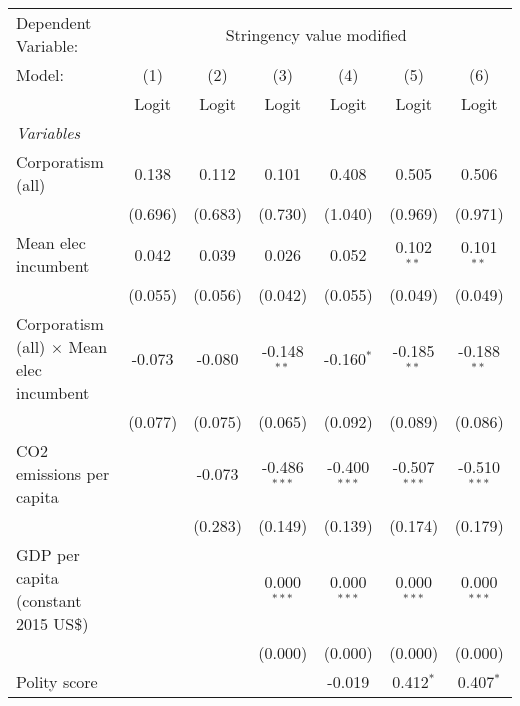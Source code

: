 
\begingroup
\centering
\begin{tabular}{lcccccc}
   \toprule
   Dependent Variable: & \multicolumn{6}{c}{Stringency value modified}\\
   Model:                                          & (1)     & (2)     & (3)            & (4)            & (5)            & (6)\\  
                                                   &  Logit  & Logit   & Logit          & Logit          & Logit          & Logit\\  
   \midrule
   \emph{Variables}\\
   Corporatism (all)                               & 0.138   & 0.112   & 0.101          & 0.408          & 0.505          & 0.506\\   
                                                   & (0.696) & (0.683) & (0.730)        & (1.040)        & (0.969)        & (0.971)\\   
   Mean elec incumbent                             & 0.042   & 0.039   & 0.026          & 0.052          & 0.102$^{**}$   & 0.101$^{**}$\\   
                                                   & (0.055) & (0.056) & (0.042)        & (0.055)        & (0.049)        & (0.049)\\   
   Corporatism (all) $\times$ Mean elec incumbent  & -0.073  & -0.080  & -0.148$^{**}$  & -0.160$^{*}$   & -0.185$^{**}$  & -0.188$^{**}$\\   
                                                   & (0.077) & (0.075) & (0.065)        & (0.092)        & (0.089)        & (0.086)\\   
   CO2 emissions per capita                        &         & -0.073  & -0.486$^{***}$ & -0.400$^{***}$ & -0.507$^{***}$ & -0.510$^{***}$\\   
                                                   &         & (0.283) & (0.149)        & (0.139)        & (0.174)        & (0.179)\\   
   GDP per capita (constant 2015 US\$)             &         &         & 0.000$^{***}$  & 0.000$^{***}$  & 0.000$^{***}$  & 0.000$^{***}$\\   
                                                   &         &         & (0.000)        & (0.000)        & (0.000)        & (0.000)\\   
   Polity score                                    &         &         &                & -0.019         & 0.412$^{*}$    & 0.407$^{*}$\\   

\end{tabular}
